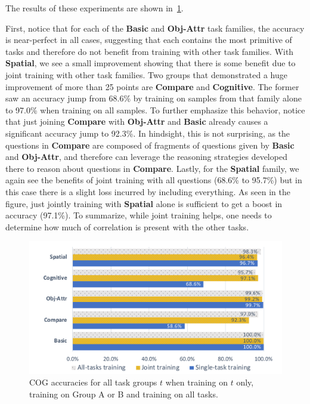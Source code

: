 The results of these experiments are shown in~\cref{fig:COG-reasoning-results}.

First, notice that for each of the \textbf{Basic} and \textbf{Obj-Attr} task families, the accuracy is near-perfect in all cases, suggesting that each contains the most primitive of tasks and therefore do not benefit from training with other task families.
With \textbf{Spatial}, we see a small improvement showing that there is some benefit due to joint training with other task families.
Two groups that demonstrated a huge improvement of more than 25 points are \textbf{Compare} and \textbf{Cognitive}.
The former saw an accuracy jump from 68.6\% by training on samples from that family alone
to 97.0\% when training on all samples. To further emphasize this behavior, notice that 
just joining \textbf{Compare} with \textbf{Obj-Attr} and \textbf{Basic} already causes a significant accuracy jump to 92.3\%. 
In hindsight, this is not surprising, as the questions in \textbf{Compare} are composed
of fragments of questions given by \textbf{Basic} and \textbf{Obj-Attr}, and therefore can leverage the reasoning strategies developed there to reason about questions in \textbf{Compare}.
Lastly, for the \textbf{Spatial} family, we again see the benefits of joint training with all questions (68.6\% to 95.7\%) but in this case there
is a slight loss incurred by including everything. As seen in the figure, just jointly training with \textbf{Spatial} alone is sufficient to get a boost in accuracy (97.1\%). To summarize, while joint training helps, one needs to determine how much of correlation is present with the other tasks.

 \begin{figure}
 	\centering
 	\includegraphics[width=\columnwidth]{img/results/COG_reasoning_transfer.pdf}
 	\caption{COG accuracies for all task groups $t$ when training on $t$ only, training on Group A or B and training on all tasks.}
 	\label{fig:COG-reasoning-results}
 \end{figure}
 

